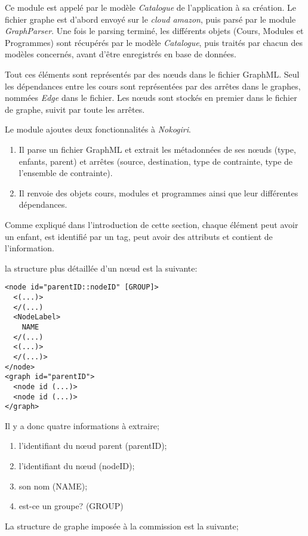 Ce module est appelé par le modèle \textit{Catalogue} de l'application à sa création. Le fichier graphe est d'abord envoyé sur le  \textit{cloud amazon}, puis parsé par le module \textit{GraphParser}. Une fois le parsing terminé, les différents objets (Cours, Modules et Programmes) sont récupérés par le modèle \textit{Catalogue}, puis traités par chacun des modèles concernés, avant d'être enregistrés en base de données. 

Tout ces éléments sont représentés par des nœuds dans le fichier GraphML. Seul les dépendances entre les cours sont représentées par des arrêtes dans le graphes, nommées \textit{Edge} dans le fichier. Les nœuds sont stockés en premier dans le fichier de graphe, suivit par toute les arrêtes. 

Le module ajoutes deux fonctionnalités à \textit{Nokogiri}.
\begin{enumerate}
  \item Il parse un fichier GraphML et extrait les métadonnées de ses nœuds (type, enfants, parent) et arrêtes (source, destination, type de contrainte, type de l'ensemble de contrainte). 
  \item Il renvoie des objets cours, modules et programmes ainsi que leur différentes dépendances.  
\end{enumerate}

 Comme expliqué dans l'introduction de cette section, chaque élément peut avoir un enfant, est identifié par un tag, peut avoir des attributs et contient de l'information. 

 la structure plus détaillée d'un nœud est la suivante:

\begin{lstlisting}
<node id="parentID::nodeID" [GROUP]>
  <(...)>
  </(...)
  <NodeLabel>
    NAME
  </(...)
  <(...)>
  </(...)>
</node>
<graph id="parentID">
  <node id (...)>
  <node id (...)>
</graph>
\end{lstlisting}

Il y a donc quatre informations à extraire;
\begin{enumerate}
  \item l'identifiant du nœud parent (parentID);
  \item l'identifiant du nœud (nodeID);
  \item son nom (NAME);
  \item est-ce un groupe? (GROUP)
\end{enumerate}

La structure de graphe imposée à la commission est la suivante; 

